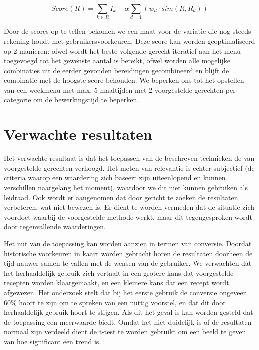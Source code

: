 \documentclass{hogent-article}
\begin{document}
\begin{equation}
    Score(R) = \sum_{k \in R}I_k - \alpha \sum_{d=1}(w_d \cdot sim(R,R_d))
\end{equation}

Door de scores op te tellen bekomen we een maat voor de variatie die nog steeds rekening houdt met gebruikersvoorkeuren. Deze score kan worden geoptimaliseerd op 2 manieren: ofwel wordt het beste volgende gerecht iteratief aan het menu toegevoegd tot het gewenste aantal is bereikt, ofwel worden alle mogelijke combinaties uit de eerder gevonden bereidingen gecombineerd en blijft de combinatie met de hoogste score behouden. We beperken ons tot het opstellen van een weekmenu met max. 5 maaltijden met 2 voorgestelde gerechten per categorie om de bewerkingstijd te beperken.

\section{Verwachte resultaten}%
\label{sec:verwachte-resultaten}


Het verwachte resultaat is dat het toepassen van de beschreven technieken de  van voorgestelde gerechten verhoogd. Het meten van relevantie is echter subjectief (de criteria waarop een waardering zich baseert zijn uiteenlopend en kunnen verschillen naargelang het moment), waardoor we dit niet kunnen gebruiken als leidraad. Ook wordt er aangenomen dat door gericht te zoeken de resultaten verbeteren, wat niet bewezen is. Er dient te worden vermeden dat de situatie zich voordoet waarbij de voorgestelde methode werkt, maar dit tegengesproken wordt door tegenvallende waarderingen. 

Het nut van de toepassing kan worden aanzien in termen van conversie. Doordat historische voorkeuren in kaart worden gebracht horen de resultaten doorheen de tijd nauwer samen te vallen met de wensen van de gebruiker. We verwachten dat het herhaaldelijk gebruik zich vertaalt in een grotere kans dat voorgestelde recepten worden klaargemaakt, en een kleinere kans dat een recept wordt afgewezen. Het onderzoek stelt dat bij het eerste gebruik de conversie ongeveer 60\% hoort te zijn om te spreken van een nuttig voorstel, en dat dit door herhaaldelijk gebruik hoort te stijgen. Als dit het geval is kan worden gesteld dat de toepassing een meerwaarde biedt. Omdat het niet duidelijk is of de resultaten normaal zijn verdeeld dient de t-test te worden gebruikt om een beeld te geven van hoe significant een trend is.
\end{document}
